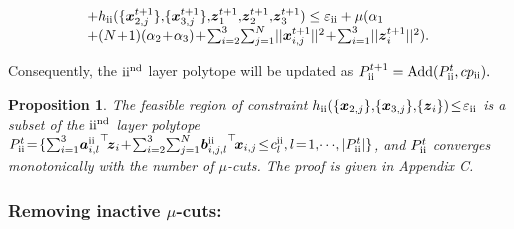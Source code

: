 \documentclass[letterpaper]{article} %
\newtheorem{prop}{Proposition}
\begin{document}
\begin{equation}
\begin{array}{l}
\!+h_{{\rm{\uppercase\expandafter{\romannumeral2}}}}(\{{\boldsymbol{x}_{2,j}^{t+1}}\} ,\!\{ {\boldsymbol{x}_{3,j}^{t+1}}\} ,\!{\boldsymbol{z}_1^{t+1}}{\rm{,}}{\boldsymbol{z}_2^{t+1}},\!{\boldsymbol{z}_3^{t+1}})
\le \varepsilon_{\rm{\uppercase\expandafter{\romannumeral2}}}  + \mu (\alpha_1 \\
\!+ (N\!+\!1)(\alpha_2\!+\!\alpha_3) \!+\! \sum\nolimits_{i = 2}^3 \! \sum\nolimits_{j = 1}^N \!||\boldsymbol{x}_{i,j}^{t+1}||^2 \!+\! \sum\nolimits_{i = 1}^3 \!||\boldsymbol{z}_i^{t+1}||^2 ).
\end{array}
\end{equation}

Consequently, the ${\rm{\uppercase\expandafter{\romannumeral2}}}^{\rm{nd}}$ layer polytope will be updated as
$ {P_{{\rm{\uppercase\expandafter{\romannumeral2}}}}^{t + 1}} = {\rm{Add}}({P_{{\rm{\uppercase\expandafter{\romannumeral2}}}}^{t}},{cp_{\rm{\uppercase\expandafter{\romannumeral2}}}}).$



\begin{prop}
\label{prop:2}
The feasible region of constraint $h_{{\rm{\uppercase\expandafter{\romannumeral2}}}}(\{{\boldsymbol{x}_{2,j}}\} ,\!\{ {\boldsymbol{x}_{3,j}}\} ,\!\{{\boldsymbol{z}_i}\})\! \le \! \varepsilon_{\rm{\uppercase\expandafter{\romannumeral2}}}$  is a subset of the ${\rm{\uppercase\expandafter{\romannumeral2}}}^{\rm{nd}}$ layer polytope  $P_{\rm{\uppercase\expandafter{\romannumeral2}}}^{t}\!=\!\{\sum\nolimits_{i = 1}^3 \!{\boldsymbol{a}_{i,l}^{{\rm{\uppercase\expandafter{\romannumeral2}}}}} ^{\top}\!{\boldsymbol{z}_i} \!+\! \sum\nolimits_{i = 2}^3 \!{\sum\nolimits_{j = 1}^N \!{\boldsymbol{b}{{_{i,j,l}^{{\rm{\uppercase\expandafter{\romannumeral2}}}}}}}^{\top}\!{\boldsymbol{x}_{i,j}} }  \!\le\! c_l^{{\rm{\uppercase\expandafter{\romannumeral2}}}},l \!=\! 1,\! \cdots \!,|P_{{\rm{\uppercase\expandafter{\romannumeral2}}}}^{t}| \}$, and  $P_{\rm{\uppercase\expandafter{\romannumeral2}}}^{t}$ converges monotonically with the number of $\mu$-cuts. The proof is given in Appendix C.
\end{prop}


\subsubsection{Removing inactive $\mu$-cuts:}
\end{document}
